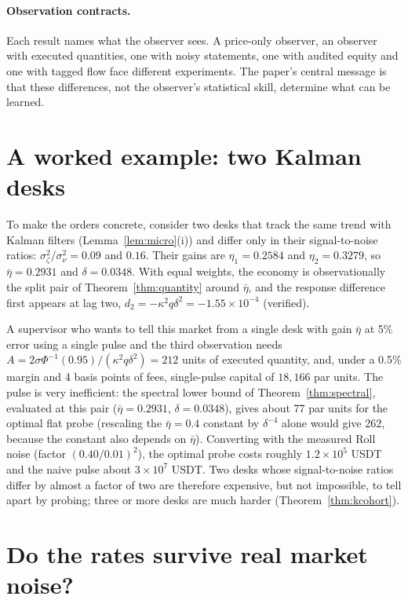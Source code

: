 \documentclass[12pt]{article}
\theoremstyle{definition}
\theoremstyle{remark}
\begin{document}
\paragraph{Observation contracts.} Each result names what the observer sees. A price-only observer, an observer with executed quantities, one with noisy statements, one with audited equity and one with tagged flow face different experiments. The paper's central message is that these differences, not the observer's statistical skill, determine what can be learned.
\section{A worked example: two Kalman desks}\label{sec:worked}

To make the orders concrete, consider two desks that track the same trend with Kalman filters (Lemma~\ref{lem:micro}(i)) and differ only in their signal-to-noise ratios: $\sigma_\zeta^2/\sigma_\nu^2=0.09$ and $0.16$. Their gains are $\eta_1=0.2584$ and $\eta_2=0.3279$, so $\bar\eta=0.2931$ and $\delta=0.0348$. With equal weights, the economy is observationally the split pair of Theorem~\ref{thm:quantity} around $\bar\eta$, and the response difference first appears at lag two, $d_2=-\kappa^2q\delta^2=-1.55\times10^{-4}$ (verified).

A supervisor who wants to tell this market from a single desk with gain $\bar\eta$ at 5\% error using a single pulse and the third observation needs $A=2\sigma\Phi^{-1}(0.95)/(\kappa^2q\delta^2)=212$ units of executed quantity, and, under a 0.5\% margin and 4 basis points of fees, single-pulse capital of $18{,}166$ par units. The pulse is very inefficient: the spectral lower bound of Theorem~\ref{thm:spectral}, evaluated at this pair ($\bar\eta=0.2931$, $\delta=0.0348$), gives about 77 par units for the optimal flat probe (rescaling the $\bar\eta=0.4$ constant by $\delta^{-4}$ alone would give 262, because the constant also depends on $\bar\eta$). Converting with the measured Roll noise (factor $(0.40/0.01)^2$), the optimal probe costs roughly $1.2\times10^5$ USDT and the naive pulse about $3\times10^7$ USDT. Two desks whose signal-to-noise ratios differ by almost a factor of two are therefore expensive, but not impossible, to tell apart by probing; three or more desks are much harder (Theorem~\ref{thm:kcohort}).

\section{Do the rates survive real market noise?}\label{sec:injection}
\end{document}
